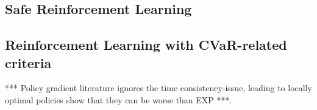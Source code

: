 \subsection{Safe Reinforcement Learning}

\citep{amodei2016concrete}
\citep{garcia2015comprehensive}
\citep{leike2017ai}
\citep{majumdar2017should}





\subsection{Reinforcement Learning with CVaR-related criteria}

*** Policy gradient literature ignores the time consistency-issue, leading to locally optimal policies show that they can be worse than EXP ***.
